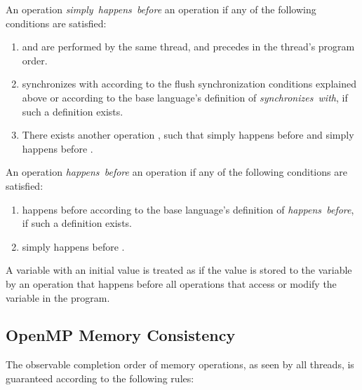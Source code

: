 An operation  \emph{simply~happens~before} an operation  if any of the following conditions are satisfied:
\begin{enumerate}
\item {} and  are performed by the same thread, and  precedes  in the thread's program order.
\item {} synchronizes with  according to the flush synchronization conditions explained above or according
    to the base language's definition of \emph{synchronizes~with}, if such a definition exists.
\item There exists another operation , such that  simply happens before  and  simply happens before .
\end{enumerate}

An operation  \emph{happens~before} an operation  if any of the following conditions are satisfied:
\begin{enumerate}
\item {} happens before  according to the base language's definition of \emph{happens~before}, if such a definition exists.
\item {} simply happens before .
\end{enumerate}

A variable with an initial value is treated as if the value is stored to the
variable by an operation that happens before all operations that access or
modify the variable in the program.

\subsection{OpenMP Memory Consistency}
\label{subsec:OpenMP Memory Consistency}

The observable completion order of memory operations, as seen by all threads, is
guaranteed according to the following rules:

